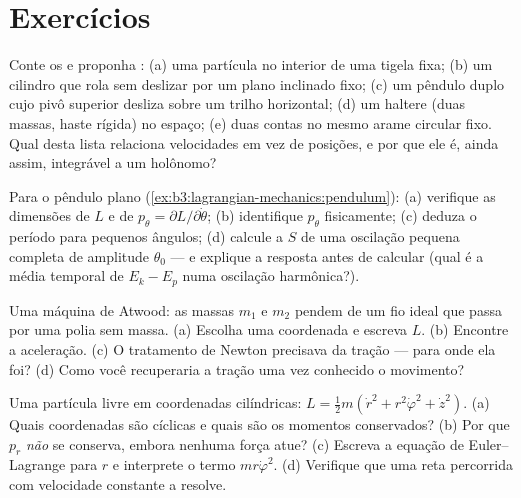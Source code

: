 \section{Exercícios}

\begin{exercise}[$\star$]\label{exo:b3:lagrangian-mechanics:1}
Conte os  e proponha : (a)
uma partícula no interior de uma tigela fixa; (b) um cilindro que rola
sem deslizar por um plano inclinado fixo; (c) um pêndulo duplo cujo
pivô superior desliza sobre um trilho horizontal; (d) um haltere (duas
massas, haste rígida) no espaço; (e) duas contas no mesmo arame
circular fixo. Qual  desta lista relaciona velocidades em vez de
posições, e por que ele é, ainda assim, integrável a um 
holônomo?
\end{exercise}

\begin{exercise}[$\star$]\label{exo:b3:lagrangian-mechanics:2}
Para o pêndulo plano (\cref{ex:b3:lagrangian-mechanics:pendulum}): (a)
verifique as dimensões de $L$ e de $p_\theta =
\partial L/\partial\dot\theta$; (b) identifique $p_\theta$ fisicamente;
(c) deduza o período para pequenos ângulos; (d) calcule a  $S$ de
uma oscilação pequena completa de amplitude $\theta_0$ --- e explique a
resposta antes de calcular (qual é a média temporal de $E_k - E_p$ numa
oscilação harmônica?).
\end{exercise}

\begin{exercise}[$\star$]\label{exo:b3:lagrangian-mechanics:3}
Uma máquina de Atwood: as massas $m_1$ e $m_2$ pendem de um fio ideal
que passa por uma polia sem massa. (a) Escolha uma coordenada e escreva
$L$. (b) Encontre a aceleração. (c) O tratamento de Newton precisava da
tração --- para onde ela foi? (d) Como você recuperaria a tração uma
vez conhecido o movimento?
\end{exercise}

\begin{exercise}[$\star$]\label{exo:b3:lagrangian-mechanics:4}
Uma partícula livre em coordenadas cilíndricas: $L = \tfrac12 m(\dot r^2 +
r^2\dot\varphi^2 + \dot z^2)$. (a) Quais coordenadas são cíclicas e
quais são os momentos conservados? (b) Por que $p_r$ \emph{não} se
conserva, embora nenhuma força atue? (c) Escreva a equação de
Euler--Lagrange para $r$ e interprete o termo $mr\dot\varphi^2$. (d)
Verifique que uma reta percorrida com velocidade constante a resolve.
\end{exercise}

